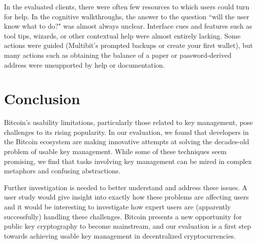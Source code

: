 In the evaluated clients, there were often few resources to which users could turn for help. In the cognitive walkthroughs, the answer to the question ``will the user know what to do?" was almost always unclear. Interface cues and features such as tool tips, wizards, or other contextual help were almost entirely lacking. Some actions were guided (\eg Multibit's prompted backups or create your first wallet), but many actions such as obtaining the balance of a paper or password-derived address were unsupported by help or documentation.  



\section{Conclusion}
Bitcoin's usability limitations, particularly those related to key management, pose challenges to its rising popularity. In our evaluation, 
we found that developers in the Bitcoin ecosystem are making innovative attempts at solving the decades-old problem of usable key management. While some of these techniques seem promising, we find that tasks involving key management can be mired in complex metaphors and confusing abstractions.

Further investigation is needed to better understand and address these issues. A user study would give insight into exactly how these problems are affecting users and it would be interesting to investigate how expert users are (apparently successfully) handling these challenges. Bitcoin presents a new opportunity for public key cryptography to become mainstream, and our evaluation is a first step towards achieving usable key management in decentralized cryptocurrencies. 




